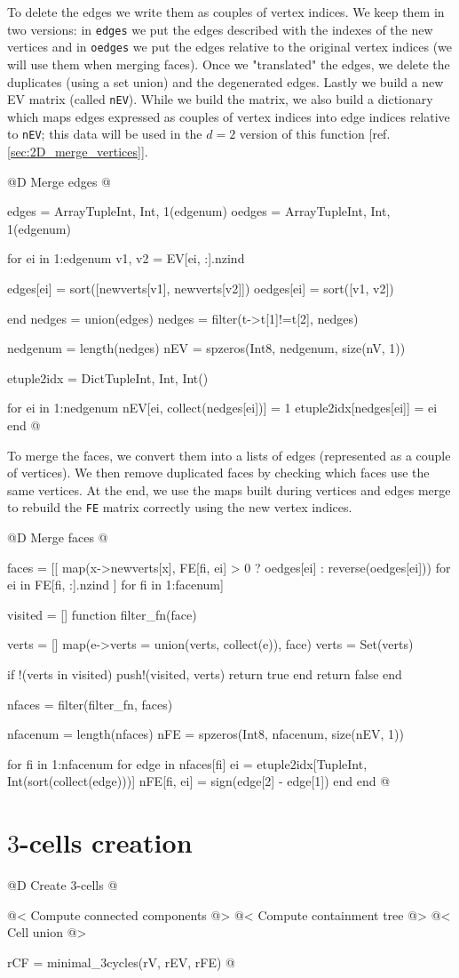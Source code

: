 To delete the edges we write them as couples of vertex
indices. We keep them in two versions: in \texttt{edges}
we put the edges described with the indexes of the new vertices
and in \texttt{oedges} we put the edges relative to the original vertex
indices (we will use them when merging faces). Once we "translated"
the edges, we delete the duplicates (using a set union) and the
degenerated edges. Lastly we build a new EV matrix 
(called \texttt{nEV}). While we
build the matrix, we also build a dictionary which maps edges expressed
as couples of vertex indices into edge indices relative to \texttt{nEV};
this data will be used in the $d=2$ version of this function 
[ref. \ref{sec:2D_merge_vertices}].

@D Merge edges
@{edges = Array{Tuple{Int, Int}, 1}(edgenum)
oedges = Array{Tuple{Int, Int}, 1}(edgenum)

for ei in 1:edgenum
    v1, v2 = EV[ei, :].nzind
    
    edges[ei] = sort([newverts[v1], newverts[v2]])
    oedges[ei] = sort([v1, v2])

end
nedges = union(edges)
nedges = filter(t->t[1]!=t[2], nedges)

nedgenum = length(nedges)
nEV = spzeros(Int8, nedgenum, size(nV, 1))

etuple2idx = Dict{Tuple{Int, Int}, Int}()

for ei in 1:nedgenum
    nEV[ei, collect(nedges[ei])] = 1
    etuple2idx[nedges[ei]] = ei
end
@}

To merge the faces, we convert them into a lists of
edges (represented as a couple of vertices). We then remove duplicated faces
by checking which faces use the same vertices. At the end, we use the
maps built during vertices and edges merge to rebuild the \texttt{FE}
matrix correctly using the new vertex indices.

@D Merge faces
@{faces = [[
    map(x->newverts[x], FE[fi, ei] > 0 ? oedges[ei] : reverse(oedges[ei]))
    for ei in FE[fi, :].nzind
] for fi in 1:facenum]


visited = []
function filter_fn(face)

    verts = []
    map(e->verts = union(verts, collect(e)), face)
    verts = Set(verts)

    if !(verts in visited)
        push!(visited, verts)
        return true
    end
    return false
end

nfaces = filter(filter_fn, faces)

nfacenum = length(nfaces)
nFE = spzeros(Int8, nfacenum, size(nEV, 1))

for fi in 1:nfacenum
    for edge in nfaces[fi]
        ei = etuple2idx[Tuple{Int, Int}(sort(collect(edge)))]
        nFE[fi, ei] = sign(edge[2] - edge[1])
    end
end
@}




\section{$3$-cells creation}

@D Create 3-cells
@{@< Compute connected components @>
@< Compute containment tree @>
@< Cell union @>

rCF = minimal_3cycles(rV, rEV, rFE)
@}